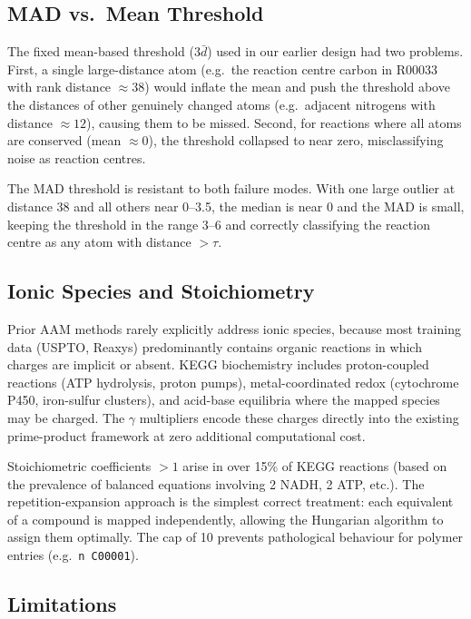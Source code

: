 \documentclass[12pt,a4paper]{article}
\begin{document}
\subsection{MAD vs.\ Mean Threshold}

The fixed mean-based threshold ($3\bar{d}$) used in our earlier design
had two problems. First, a single large-distance atom (e.g.\ the
reaction centre carbon in R00033 with rank distance $\approx 38$)
would inflate the mean and push the threshold above the distances of
other genuinely changed atoms (e.g.\ adjacent nitrogens with distance
$\approx 12$), causing them to be missed. Second, for reactions where
all atoms are conserved (mean $\approx 0$), the threshold collapsed to
near zero, misclassifying noise as reaction centres.

The MAD threshold is resistant to both failure modes. With one large
outlier at distance 38 and all others near 0--3.5, the median is near
0 and the MAD is small, keeping the threshold in the range 3--6 and
correctly classifying the reaction centre as any atom with distance
$> \tau$.

\subsection{Ionic Species and Stoichiometry}

Prior AAM methods rarely explicitly address ionic species, because
most training data (USPTO, Reaxys) predominantly contains organic
reactions in which charges are implicit or absent. KEGG biochemistry
includes proton-coupled reactions (ATP hydrolysis, proton pumps),
metal-coordinated redox (cytochrome P450, iron-sulfur clusters), and
acid-base equilibria where the mapped species may be charged. The
$\gamma$ multipliers encode these charges directly into the existing
prime-product framework at zero additional computational cost.

Stoichiometric coefficients $>1$ arise in over 15\% of KEGG reactions
(based on the prevalence of balanced equations involving 2 NADH, 2 ATP,
etc.). The repetition-expansion approach is the simplest correct
treatment: each equivalent of a compound is mapped independently,
allowing the Hungarian algorithm to assign them optimally. The cap of
10 prevents pathological behaviour for polymer entries
(e.g.\ \texttt{n C00001}).

\subsection{Limitations}
\end{document}
